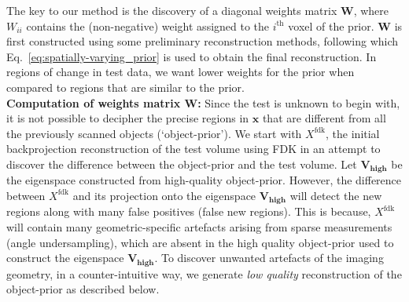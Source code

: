 \documentclass[journal]{IEEEtran}
\begin{document}
The key to our method is the discovery of a diagonal weights
 matrix $\boldsymbol{W}$, where $W_{ii}$ contains the (non-negative) weight assigned to the $i^{\textrm{th}}$ voxel of the prior. $\boldsymbol{W}$ is first constructed using some preliminary reconstruction methods, following which Eq.~\ref{eq:spatially-varying_prior} is used to obtain the final reconstruction. In regions of change in test data, we want lower weights for the prior when compared to regions that are similar to the prior.  
 \\
 
\textbf{Computation of weights matrix $\boldsymbol{W}$:}
Since the test is unknown to
begin with, it is not possible to decipher the precise regions in
$\boldsymbol{x}$ that are different from all the previously scanned
objects (`object-prior'). We start with $X^{\text{fdk}}$, the initial
backprojection reconstruction of the test volume using FDK in an attempt to
discover the difference between the object-prior and the test
volume. Let $\boldsymbol{V_{\text{high}}}$ be the eigenspace
constructed from high-quality object-prior. However, the difference
between $X^{\text{fdk}}$ and its projection onto the eigenspace
$\boldsymbol{V_{\text{high}}}$ will detect the new regions along with
many false positives (false new regions). This is because,
$X^{\text{fdk}}$ will contain many geometric-specific artefacts
arising from sparse measurements (angle undersampling), which are
absent in the high quality object-prior used to construct the
eigenspace $\boldsymbol{V_{\text{high}}}$. To discover unwanted
artefacts of the imaging geometry, in a counter-intuitive way, we
generate \emph{low quality} reconstruction of the object-prior as
described below.
\\
\end{document}
